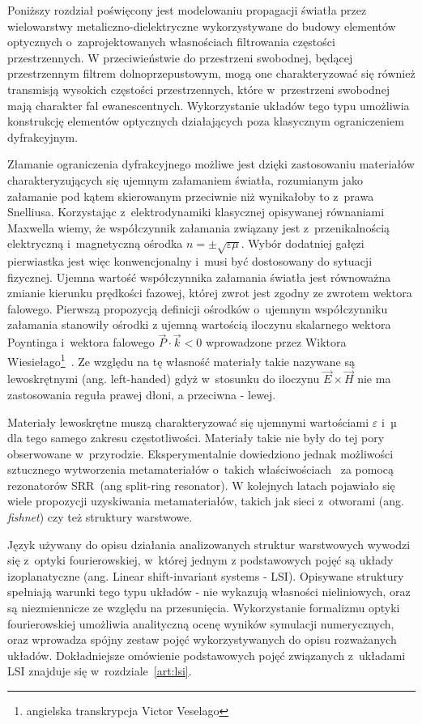 Poniższy rozdział poświęcony jest modelowaniu propagacji światła przez wielowarstwy metaliczno-dielektryczne wykorzystywane do  budowy elementów optycznych o~zaprojektowanych własnościach filtrowania częstości przestrzennych. W przeciwieństwie do przestrzeni swobodnej, będącej przestrzennym filtrem dolnoprzepustowym, mogą one charakteryzować się również transmisją wysokich częstości przestrzennych, które w~przestrzeni swobodnej mają charakter fal ewanescentnych. Wykorzystanie układów tego typu umożliwia konstrukcję elementów optycznych działających poza klasycznym ograniczeniem dyfrakcyjnym.

Złamanie ograniczenia dyfrakcyjnego możliwe jest dzięki zastosowaniu materiałów charakteryzujących się ujemnym załamaniem światła, rozumianym jako załamanie pod kątem skierowanym przeciwnie niż wynikałoby to z~prawa Snelliusa. Korzystając z~elektrodynamiki klasycznej opisywanej równaniami \nohyphens{Maxwella} wiemy, że współczynnik załamania związany jest z~przenikalnością elektryczną i~magnetyczną ośrodka $n = \pm \sqrt{ \varepsilon \mu}$. Wybór dodatniej gałęzi pierwiastka jest więc konwencjonalny i~musi być dostosowany do sytuacji fizycznej. Ujemna wartość współczynnika załamania światła jest równoważna zmianie kierunku prędkości fazowej, której zwrot jest zgodny ze zwrotem wektora falowego. Pierwszą propozycją definicji ośrodków o~ujemnym współczynniku załamania stanowiły ośrodki z ujemną wartością iloczynu skalarnego wektora Poyntinga i~wektora falowego $\vec{P} \cdot \vec{k} < 0$ wprowadzone przez Wiktora Wiesiełago\footnote{angielska transkrypcja Victor Veselago}~\cite{veselago1968electrodynamics}. Ze względu na tę własność materiały takie nazywane są lewoskrętnymi (ang. left-handed) gdyż w~stosunku do iloczynu $\vec{E} \times \vec{H}$ nie ma zastosowania reguła prawej dłoni, a przeciwna - lewej.

Materiały lewoskrętne muszą charakteryzować się ujemnymi wartościami $\varepsilon$ i~µ dla tego samego zakresu częstotliwości. Materiały takie nie były do tej pory obserwowane w~przyrodzie. Eksperymentalnie dowiedziono jednak możliwości sztucznego wytworzenia metamateriałów o~takich właściwościach~\cite{PhysRevLett.84.4184} za pomocą rezonatorów SRR~(ang split-ring resonator). W kolejnych latach pojawiało się wiele propozycji uzyskiwania metamateriałów, takich jak sieci z~otworami (ang. \textit{fishnet}) czy też struktury warstwowe.

Język używany do opisu działania analizowanych struktur warstwowych wywodzi się z~optyki fourierowskiej, w~której jednym z podstawowych pojęć są układy izoplanatyczne (ang. Linear shift-invariant systems - LSI). Opisywane struktury spełniają warunki tego typu układów - nie wykazują własności nieliniowych, oraz są niezmiennicze ze względu na przesunięcia. Wykorzystanie formalizmu optyki fourierowskiej umożliwia analityczną ocenę wyników symulacji numerycznych, oraz wprowadza spójny zestaw pojęć wykorzystywanych do opisu rozważanych układów. Dokładniejsze omówienie podstawowych pojęć związanych z~układami LSI znajduje się w~rozdziale~\ref{art:lsi}.


